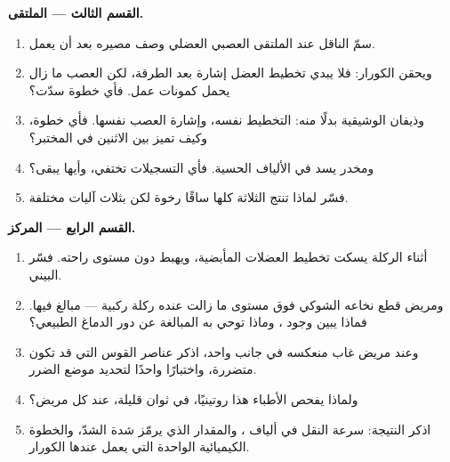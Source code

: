 \begin{problem}
\medskip
\noindent\textbf{القسم الثالث --- الملتقى.}
\begin{enumerate}[resume]
  \item سمّ الناقل عند الملتقى العصبي العضلي وصف مصيره بعد أن يعمل.
  \item ويحقن الكورار: فلا يبدي تخطيط العضل إشارة بعد الطرقة، لكن
        العصب ما زال يحمل كمونات عمل. فأي خطوة سدّت؟
  \item وذيفان الوشيقية بدلًا منه: التخطيط نفسه، وإشارة العصب نفسها.
        فأي خطوة، وكيف تميز بين الاثنين في المختبر؟
  \item ومخدر يسد  في الألياف الحسية. فأي التسجيلات تختفي،
        وأيها يبقى؟
  \item فسّر لماذا تنتج الثلاثة كلها ساقًا رخوة لكن بثلاث آليات
        مختلفة.
\end{enumerate}

\medskip
\noindent\textbf{القسم الرابع --- المركز.}
\begin{enumerate}[resume]
  \item أثناء الركلة يسكت تخطيط العضلات المأبضية، ويهبط دون مستوى
        راحته. فسّر  البيني.
  \item ومريض قطع نخاعه الشوكي فوق مستوى  ما زالت عنده ركلة
        ركبية --- مبالغ فيها. فماذا يبين وجود ، وماذا توحي به
        المبالغة عن دور الدماغ الطبيعي؟
  \item وعند مريض غاب منعكسه في جانب واحد، اذكر عناصر القوس التي قد
        تكون متضررة، واختبارًا واحدًا لتحديد موضع الضرر.
  \item ولماذا يفحص الأطباء هذا  روتينيًا، في ثوان قليلة، عند كل
        مريض؟
  \item اذكر النتيجة: سرعة النقل في ألياف ، والمقدار الذي يرمّز
        شدة الشدّ، والخطوة الكيميائية الواحدة التي يعمل عندها الكورار.
\end{enumerate}
\end{problem}
